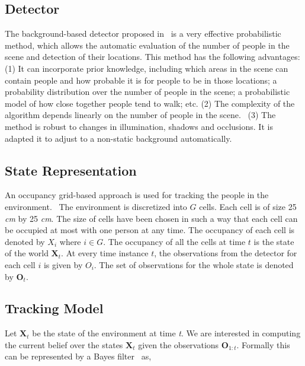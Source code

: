 \subsection{Detector}
The background-based detector proposed in~\cite{englebienne-bnaic} is a very effective probabilistic method, which allows the automatic evaluation of the number of people in the scene and detection of their locations. This method has the following advantages: (1) It can incorporate prior knowledge, including which areas in the scene can contain people and how probable it is for people to be in those locations; a probability distribution over the number of people in the scene; a probabilistic model of how close
together people tend to walk; etc. (2) The complexity of the algorithm depends linearly on the number of people in the scene.%
~(3) The method is robust to changes in illumination, shadows and occlusions. It is adapted it to adjust to a non-static background automatically.

\subsection{State Representation}

An occupancy grid-based approach is used for tracking the people in the environment.%
~The environment is discretized into $G$ cells. Each cell is of size 25 \textit{cm} by 25 \textit{cm}. The size of cells have been chosen in such a way that each cell can be occupied at most with one person at any time. The occupancy of each cell is denoted by $X_{i}$ where $i \in G$. The occupancy of all the cells at time $t$ is the state of the world $\textbf{X}_{t}$. At every time instance $t$, the observations from the detector for each cell $i$ is given by $O_{i}$. The set of observations for the whole state is denoted by $\textbf{O}_{t}$. 

\subsection{Tracking Model}

Let $\textbf{X}_{t}$ be the state of the environment at time \textit{t}. We are interested in computing the current belief over the states $\textbf{X}_{t}$ given the observations $\textbf{O}_{1:t}$. Formally this can be represented by a Bayes filter~\cite{khan2004mcmc} as,

